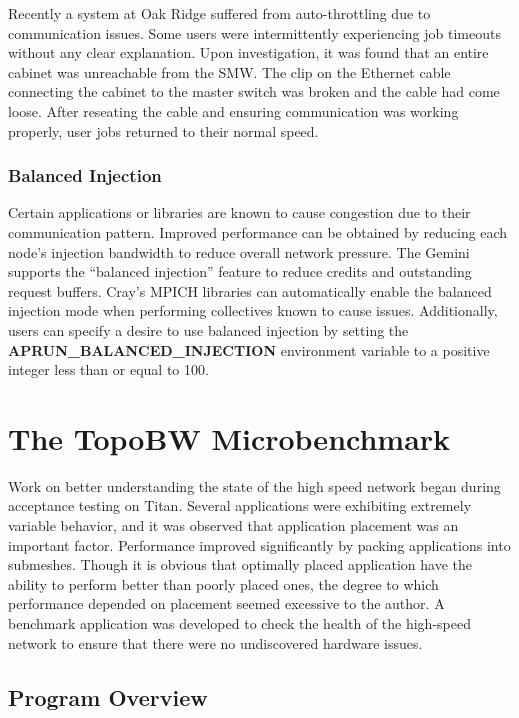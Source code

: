 \documentclass[10pt, conference, compsocconf]{IEEEtran}
\begin{document}
Recently a system at Oak Ridge suffered from auto-throttling due to
communication issues.  Some users were intermittently experiencing job timeouts
without any clear explanation.  Upon investigation, it was found that an entire
cabinet was unreachable from the SMW.  The clip on the Ethernet cable
connecting the cabinet to the master switch was broken and the cable had come
loose.  After reseating the cable and ensuring communication was working
properly, user jobs returned to their normal speed.

\subsubsection{Balanced Injection}

Certain applications or libraries are known to cause congestion due to their
communication pattern.  Improved performance can be obtained by reducing each
node's injection bandwidth to reduce overall network pressure.  The Gemini
supports the ``balanced injection'' feature to reduce credits and outstanding
request buffers.  Cray's MPICH libraries can automatically enable the balanced
injection mode when performing collectives known to cause issues.
Additionally, users can specify a desire to use balanced injection by setting
the \textbf{APRUN\_BALANCED\_INJECTION} environment variable to a positive
integer less than or equal to 100.

\section{The TopoBW Microbenchmark}

Work on better understanding the state of the high speed network began during
acceptance testing on Titan.  Several applications were exhibiting extremely
variable behavior, and it was observed that application placement was an
important factor.  Performance improved significantly by packing applications
into submeshes.  Though it is obvious that optimally placed application have
the ability to perform better than poorly placed ones, the degree to which
performance depended on placement seemed excessive to the author.  A benchmark
application was developed to check the health of the high-speed network to
ensure that there were no undiscovered hardware issues.

\subsection{Program Overview}
\end{document}
